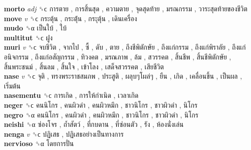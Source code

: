 \textbf{morto} \emph{adj}  ␝ϲ   การตาย ,  การสิ้นสุด ,  ความตาย ,  จุดสุดท้าย ,  มรณกรรม ,  วาระสุดท้ายของชีวิต   \\
\textbf{move} \emph{v}  ␝ϲ   กระตุ้น ,  กระตุ้่น ,  กระุตุ้น ,  เดินเครื่อง   \\
\textbf{mudo} ␝α   เป็นใบ้ ,  ใบ้   \\
\textbf{multitut} ␝ϲ   ฝูง   \\
\textbf{muri} \emph{v}  ␝ϲ   จบชีวิต ,  จากไป ,  ซี้ ,  ดับ ,  ตาย ,  ถึงชีพิตักษัย ,  ถึงแก่กรรม ,  ถึงแก่พิราลัย ,  ถึงแก่อนิจกรรม ,  ถึงแก่อสัญกรรม ,  ทิวงคต ,  มรณภาพ ,  ล้ม ,  สวรรคต ,  สิ้นชีพ ,  สิ้นชีพิตักษัย ,  สิ้นพระชนม์ ,  สิ้นลม ,  สิ้นใจ ,  เข้าโลง ,  เสด็จสวรรคต ,  เสียชีวิต   \\
\textbf{nase} \emph{v}  ␝ϲ   จุติ ,  ทรงพระราชสมภพ ,  ประสูติ ,  ผลุบๆโผล่ๆ ,  ยืน ,  เกิด ,  เคลื่อนขึ้น ,  เป็นผล ,  เริ่มต้น   \\
\textbf{nasementu} ␝ϲ   การเกิด ,  การให้กำเนิด ,  เวลาเกิด   \\
\textbf{neger} ␝ϲ   คนนิโกร ,  คนผิวดำ ,  คนผิวหมึก ,  ชาวนิโกร ,  ชาวผิวดำ ,  นิโกร   \\
\textbf{negro} ␝α   คนนิโกร ,  คนผิวดำ ,  คนผิวหมึก ,  ชาวนิโกร ,  ชาวผิวดำ ,  นิโกร   \\
\textbf{neishi} ␝α   ซ่องโจร ,  ถ้ำสัตว์ ,  ที่กบดาน ,  ที่ซ่อนตัว ,  รัง ,  ห้องนั่งเล่น   \\
\textbf{nenga} \emph{v}  ␝ϲ   ปฏิเสธ ,  ปฏิเสธอย่างเป็นทางการ   \\
\textbf{nervioso} ␝α   โดยการปั่น   \\
